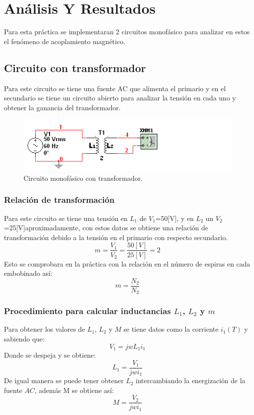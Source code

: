 \documentclass[twocolumn]{IEEEtran}
\begin{document}
\section{Análisis Y Resultados}
\noindent
Para esta práctica se implementaran 2 circuitos monofásico para analizar en estos el fenómeno de acoplamiento magnético.

\subsection{Circuito con transformador }
\noindent
Para este circuito se tiene una fuente AC que alimenta el primario y en el secundario se tiene un circuito abierto para analizar la tensión en cada uno y obtener la ganancia del transformador.
\begin{figure}[H]
	\centering
		\includegraphics[scale=0.7]{circ1.PNG}
	\caption{Circuito monofásico con transformador.}
	\label{fig10}
\end{figure}

\subsubsection{Relación de transformación}
\noindent
Para este circuito se tiene  una tensión en $L_1$ de $V_1$=50[V], y en $L_2$ un $V_2$=25[V]aproximadamente, con estos datos se obtiene una relación de transformación debido a la tensión en el primario con respecto secundario.
\begin{equation}
 m =  \frac{V_1}{V_2}=\frac{50[V]}{25[V]}=2
\label{ecu30}
\end{equation}
\noindent
Esto se comprobara en la práctica con la relación en el número de espiras en cada embobinado así:
\begin{equation}
 m =  \frac{N_2}{N_2}
\label{ecu31}
\end{equation}

\subsubsection{Procedimiento para calcular inductancias $L_1$, $L_2$ y $m$}
\noindent
Para obtener los valores de $L_1$, $L_2$ y $M$ se tiene datos como la corriente $i_1(T)$ y sabiendo que:
\begin{equation}
 V_1=jwL_1i_1
\label{ecu50}
\end{equation}
\noindent
Donde se despeja y se obtiene:
\begin{equation}
 L_1=\frac{V_1}{jw i_1}
\label{ecu51}
\end{equation}
\noindent
De igual manera se puede tener obtener $L_2$ intercambiando la energización de la fuente $AC$, además M se obtiene así:
\begin{equation}
 M=\frac{V_2}{jw i_1}
\label{ecu52}
\end{equation}
\end{document}
